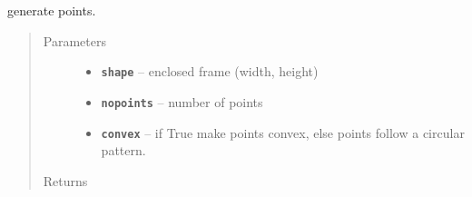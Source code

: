 \documentclass[letterpaper,10pt,english]{sphinxmanual}
\begin{document}
\begin{fulllineitems}
\label{RRtoolbox.lib.arrayops:RRtoolbox.lib.arrayops.basic.points_generator}
generate points.
\begin{quote}\begin{description}
\item[{Parameters}] \leavevmode\begin{itemize}
\item {} 
\textbf{\texttt{shape}} -- enclosed frame (width, height)

\item {} 
\textbf{\texttt{nopoints}} -- number of points

\item {} 
\textbf{\texttt{convex}} -- if True make points convex,
else points follow a circular pattern.

\end{itemize}

\item[{Returns}] \leavevmode


\end{description}\end{quote}

\end{fulllineitems}

\end{document}
